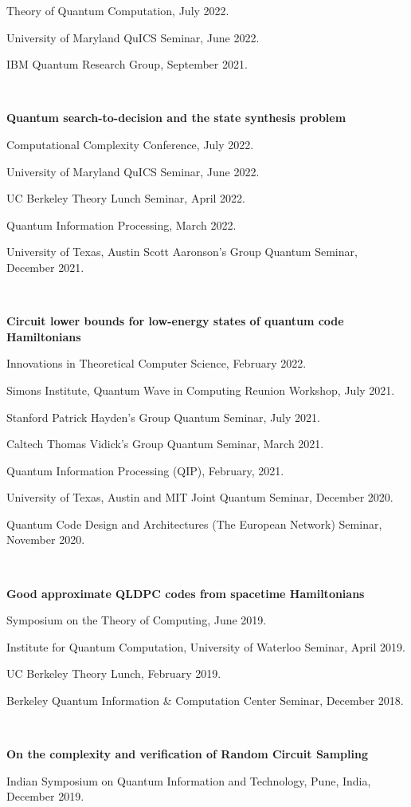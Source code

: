 \documentclass[11pt]{article}
\begin{document}
Theory of Quantum Computation, July 2022.

University of Maryland QuICS Seminar, June 2022.

IBM Quantum Research Group, September 2021.

\

\textbf{Quantum search-to-decision and the state synthesis problem}

Computational Complexity Conference, July 2022.

University of Maryland QuICS Seminar, June 2022.

UC Berkeley Theory Lunch Seminar, April 2022.

Quantum Information Processing, March 2022.

University of Texas, Austin Scott Aaronson's Group Quantum Seminar, December 2021.

\

\textbf{Circuit lower bounds for low-energy states of quantum code Hamiltonians}

Innovations in Theoretical Computer Science, February 2022.

Simons Institute, Quantum Wave in Computing Reunion Workshop, July 2021.

Stanford Patrick Hayden's Group Quantum Seminar, July 2021.

Caltech Thomas Vidick's Group Quantum Seminar, March 2021.

Quantum Information Processing (QIP), February, 2021.

University of Texas, Austin and MIT Joint Quantum Seminar, December 2020. 

Quantum Code Design and Architectures (The European Network) Seminar, November 2020.

\

\textbf{Good approximate QLDPC codes from spacetime Hamiltonians}

Symposium on the Theory of Computing, June 2019.

Institute for Quantum Computation, University of Waterloo Seminar, April 2019.

UC Berkeley Theory Lunch, February 2019.

Berkeley Quantum Information \& Computation Center Seminar, December 2018.

\

\textbf{On the complexity and verification of Random Circuit Sampling}

Indian Symposium on Quantum Information and Technology, Pune, India, December 2019.
\end{document}
